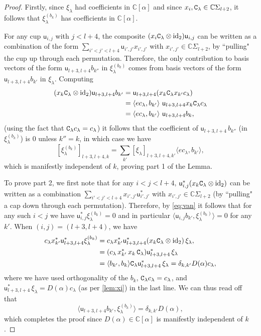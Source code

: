 \documentclass{article}
\theoremstyle{definition}
\newcommand{\Sym}{\Sigma}  %
\def\uu{{\mathsf u}} %
\def\a{\alpha}
\def\l{\lambda}
\def\C{\mathbb{C}}
\numberwithin{equation}{subsection}
\begin{document}
\begin{proof} 
Firstly, since $\xi_\l$ had coefficients in $\C[\a]$ and since $x_i, \nC_\l \in \C \Sym_{l+2}$, it follows that $\xi_\l^{(b_k)}$ has coefficients in $\C[\a]$. 

For any cup $\uu_{i,j}$ with $j<l+4$, the composite $(x_i \nC_\l  \otimes \text{id}_2)\uu_{i,j}$ can be written as a combination of the form $\sum_{i'<j'<l+4} \uu_{i',j'} x_{i',j'}$ with $x_{i',j'}\in \C\Sym_{l+2}$, by ``pulling" the cup up through each permutation. Therefore, the only contribution to basis vectors of the form  $\uu_{l+3,l+4} b_{k''}$ in $\xi_\l^{(b_k)}$ comes from basis vectors of the form $\uu_{l+3,l+4} b_{k'}$ in $\xi_\l$. Computing
\begin{align*}(x_k \nC_\l  \otimes \text{id}_2) \uu_{l+3,l+4} b_{k'}&=\uu_{l+3,l+4}(x_k \nC_\l x_{k'} c_{\l})\\
&=\langle e c_\l, b_{k'}\rangle \  \uu_{l+3,l+4}x_k \nC_{\l} c_{\l}\\
&=\langle e c_{\l}, b_{k'}\rangle \ \uu_{l+3,l+4}b_k,\end{align*}
(using the fact that $\nC_{\l} c_{\l}=c_{\l}$) it follows that the coefficient of $\uu_{l+3,l+4} \, b_{k''}$ (in $\xi_\l^{(b_k)}$) is 0 unless $k''=k$, in which case we have
\[ \left[\xi_\l^{(b_k)}\right]_{l+3,l+4,k}= \sum_{k'} \left[\xi_\l \right]_{l+3,l+4,k'} \langle e c_\l ,b_{k'}\rangle,\]
which is manifestly independent of $k$, proving part 1 of the Lemma.

To prove part 2, we first note that for any $i<j<l+4$, $\uu_{i,j}^* (x_k \nC_\l\otimes \text{id}_2)$ can be written as a combination $\sum_{i'<j'<l+4} x_{i',j'}\uu^*_{i',j'}$ with  $x_{i',j'}\in \C \Sym_{l+2}$ (by ``pulling" a cap down through each permutation). Therefore, by \eqref{eq:van} it follows that for any such $i<j$ we have $\uu_{i,j}^*\xi_{\l}^{(b_k)}=0$ and in particular $\langle \uu_{i,j} b_{k'}, \xi_{\l}^{(b_k)}   \rangle =0$ for any $k'$. When $(i,j)=(l+3,l+4)$, we have
\begin{align*}
    c_{\l} x_{k'}^* \uu_{l+3,l+4}^* \xi_{\l}^{(b_k)}&= 
    c_{\l} x_{k'}^* \uu_{l+3,l+4}^* (x_k \nC_\l \otimes \text{id}_2) \, \xi_\l,\\
    &=(c_\l \,  x_{k'}^* \, x_k \, \nC_\l) \uu_{l+3,l+4}^* \, \xi_\l\\
    &=\langle b_{k'} , b_k\rangle \nC_\l \uu_{l+3,l+4}^* \, \xi_\l=\delta_{k,k'}D(\a) c_\l, 
\end{align*}
where we have used orthogonality of the $b_k$, $\nC_\l c_\l=c_\l$, and $\uu_{l+3,l+4}^* \, \xi_\l= D(\a) c_\l$ (as per \ref{lem:xi}) in the last line. We can thus read off that 
\[
\langle \uu_{l+3,l+4} b_{k'}, \xi_{\l}^{(b_k)}  \rangle =\delta_{k,k'} D(\a),
\]
which completes the proof since $D(\a)\in \C[\a]$ is manifestly independent of $k$. 
\end{proof}
\end{document}
